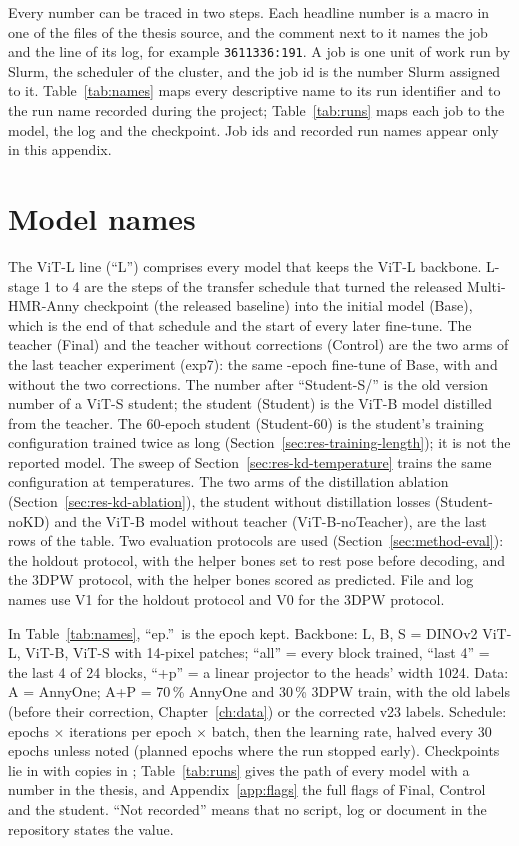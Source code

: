 Every number can be traced in two steps. Each headline number is a macro in one of the files  of
the thesis source, and the comment next to it names the job and the line of its log, for example
\texttt{3611336:191}. A job is one unit of work run by Slurm, the scheduler of the cluster, and the job id is the
number Slurm assigned to it. Table~\ref{tab:names} maps every descriptive name to its run identifier and to the run
name recorded during the project; Table~\ref{tab:runs} maps each job to the model, the log and the checkpoint. Job
ids and recorded run names appear only in this appendix.

\section{Model names}
\label{sec:app-names}

The ViT-L line (``L'') comprises every model that keeps the ViT-L backbone. L-stage 1 to 4 are the steps of the
transfer schedule that turned the released Multi-HMR-Anny checkpoint (the released baseline) into the initial model (Base), which is the end of that
schedule and the start of every later fine-tune. The teacher (Final) and the teacher without corrections (Control)
are the two arms of the last teacher experiment (exp7): the same \MethodFinalEpochs-epoch fine-tune of Base, with and
without the two corrections. The number after ``Student-S/'' is the old version number of a ViT-S student; the
student (Student) is the ViT-B model distilled from the teacher. The 60-epoch student (Student-60) is the student's
training configuration trained twice as long (Section~\ref{sec:res-training-length}); it is not the reported model.
The sweep of Section~\ref{sec:res-kd-temperature} trains the same configuration at \KDSweepArms{} temperatures.
The two arms of the distillation ablation (Section~\ref{sec:res-kd-ablation}), the student without distillation
losses (Student-noKD) and the ViT-B model without teacher (ViT-B-noTeacher), are the last rows of the table.
Two evaluation protocols are used (Section~\ref{sec:method-eval}): the holdout protocol, with the helper bones set to
rest pose before decoding, and the 3DPW protocol, with the helper bones scored as predicted. File and log names use V1
for the holdout protocol and V0 for the 3DPW protocol.

In Table~\ref{tab:names}, ``ep.''\ is the epoch kept. Backbone: L, B, S = DINOv2 ViT-L, ViT-B, ViT-S with 14-pixel
patches; ``all'' = every block trained, ``last 4'' = the last 4 of 24 blocks, ``+p'' = a linear projector to the
heads' width 1024. Data: A = AnnyOne; A+P = 70\,\% AnnyOne and 30\,\% 3DPW train, with the old labels (before their
correction, Chapter~\ref{ch:data}) or the corrected v23 labels. Schedule: epochs $\times$ iterations per epoch
$\times$ batch, then the learning rate, halved every 30 epochs unless noted (planned epochs where the run stopped
early). Checkpoints lie in  with copies in ;
Table~\ref{tab:runs} gives the path of every model with a number in the thesis, and Appendix~\ref{app:flags} the
full flags of Final, Control and the student. ``Not recorded'' means that no script, log or document in the
repository states the value.

